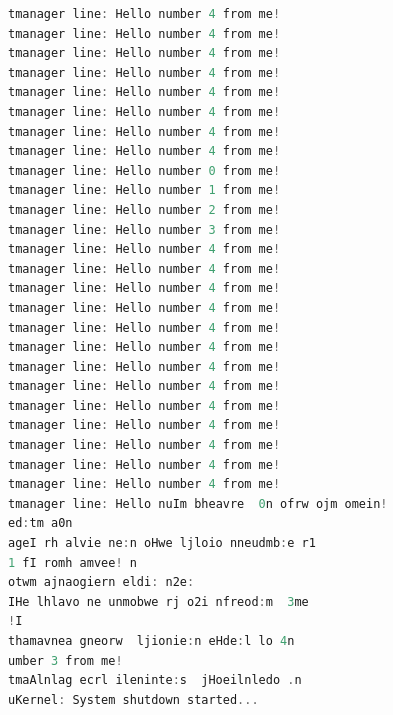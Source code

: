 \documentclass[11pt,a4paper]{article}
\theoremstyle{plain}
\theoremstyle{definition}
\theoremstyle{remark}
\numberwithin{equation}{section}
\begin{document}
\begin{lstlisting}[language=C,caption={Test msgtest.c Prints},label={lst:msgtest_c}]
tmanager line: Hello number 4 from me!
tmanager line: Hello number 4 from me!
tmanager line: Hello number 4 from me!
tmanager line: Hello number 4 from me!
tmanager line: Hello number 4 from me!
tmanager line: Hello number 4 from me!
tmanager line: Hello number 4 from me!
tmanager line: Hello number 4 from me!
tmanager line: Hello number 0 from me!
tmanager line: Hello number 1 from me!
tmanager line: Hello number 2 from me!
tmanager line: Hello number 3 from me!
tmanager line: Hello number 4 from me!
tmanager line: Hello number 4 from me!
tmanager line: Hello number 4 from me!
tmanager line: Hello number 4 from me!
tmanager line: Hello number 4 from me!
tmanager line: Hello number 4 from me!
tmanager line: Hello number 4 from me!
tmanager line: Hello number 4 from me!
tmanager line: Hello number 4 from me!
tmanager line: Hello number 4 from me!
tmanager line: Hello number 4 from me!
tmanager line: Hello number 4 from me!
tmanager line: Hello number 4 from me!
tmanager line: Hello nuIm bheavre  0n ofrw ojm omein!
ed:tm a0n
ageI rh alvie ne:n oHwe ljloio nneudmb:e r1 
1 fI romh amvee! n
otwm ajnaogiern eldi: n2e:
IHe lhlavo ne unmobwe rj o2i nfreod:m  3me
!I
thamavnea gneorw  ljionie:n eHde:l lo 4n
umber 3 from me!
tmaAlnlag ecrl ileninte:s  jHoeilnledo .n
uKernel: System shutdown started...

\end{lstlisting}
\end{document}
